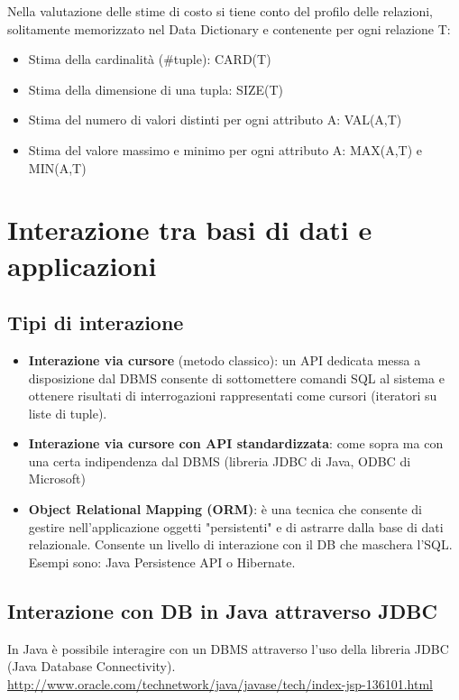 \documentclass[a4paper, 10pt]{article}
\theoremstyle{definition}
\begin{document}
		\noindent
		Nella valutazione delle stime di costo si tiene conto del profilo
		delle relazioni, solitamente memorizzato nel Data Dictionary
		e contenente per ogni relazione T:
		\begin{itemize}
			\item Stima della cardinalità (\#tuple): CARD(T)
			\item Stima della dimensione di una tupla: SIZE(T)
			\item Stima del numero di valori distinti per ogni attributo A:
			VAL(A,T)
			\item Stima del valore massimo e minimo per ogni attributo A:
			MAX(A,T) e MIN(A,T)
		\end{itemize}
		
	\section{Interazione tra basi di dati e applicazioni}
		\subsection{Tipi di interazione}
			\begin{itemize}
				\item \textbf{Interazione via cursore} (metodo classico): un API dedicata
				messa a disposizione dal DBMS consente di sottomettere
				comandi SQL al sistema e ottenere risultati di
				interrogazioni rappresentati come cursori (iteratori su liste
				di tuple).
				\item \textbf{Interazione via cursore con API standardizzata}: come
				sopra ma con una certa indipendenza dal DBMS (libreria
				JDBC di Java, ODBC di Microsoft)
				\item \textbf{Object Relational Mapping (ORM)}: è una tecnica che
				consente di gestire nell'applicazione oggetti "persistenti" e
				di astrarre dalla base di dati relazionale. Consente un livello
				di interazione con il DB che maschera l'SQL. Esempi sono:
				Java Persistence API o Hibernate.
			\end{itemize}
		\subsection{Interazione con DB in Java attraverso JDBC}
			In Java è possibile interagire con un DBMS attraverso
			l'uso della libreria JDBC (Java Database Connectivity).
			\href{http://www.oracle.com/technetwork/java/javase/tech/index-jsp-136101.html}{http://www.oracle.com/technetwork/java/javase/tech/index-jsp-136101.html}
			
\end{document}
